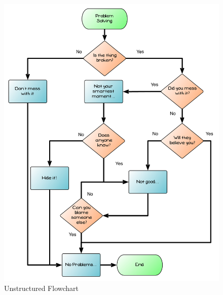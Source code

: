 \begin{figure}[htbp]
   \centering
   \includegraphics[width=\textwidth]{./topics/control-flow/diagrams/UnstructuredFlowSample} 
   \caption{Unstructured Flowchart}
   \label{fig:unstructured-flow-example}
\end{figure}

